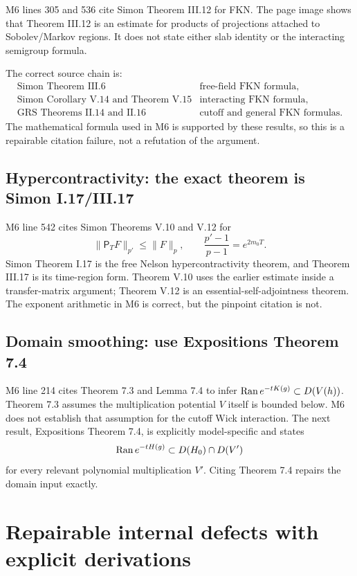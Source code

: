 \documentclass[10pt,a4paper]{article}
\begin{document}
M6 lines 305 and 536 cite Simon Theorem III.12 for FKN.  The page image shows that
Theorem III.12 is an estimate for products of projections attached to Sobolev/Markov
regions.  It does not state either slab identity or the interacting semigroup formula.

The correct source chain is:
\[
 \begin{array}{ll}
 \text{Simon Theorem III.6} & \text{free-field FKN formula},\\
 \text{Simon Corollary V.14 and Theorem V.15} & \text{interacting FKN formula},\\
 \text{GRS Theorems II.14 and II.16} & \text{cutoff and general FKN formulas}.
 \end{array}
\]
The mathematical formula used in M6 is supported by these results, so this is a
repairable citation failure, not a refutation of the argument.

\subsection{Hypercontractivity: the exact theorem is Simon I.17/III.17}

M6 line 542 cites Simon Theorems V.10 and V.12 for
\[
 \|\mathsf P_TF\|_{p'}\leq\|F\|_p,
 \qquad\frac{p'-1}{p-1}=e^{2m_0T}.
\]
Simon Theorem I.17 is the free Nelson hypercontractivity theorem, and Theorem III.17
is its time-region form.  Theorem V.10 uses the earlier estimate inside a transfer-matrix
argument; Theorem V.12 is an essential-self-adjointness theorem.  The exponent arithmetic
in M6 is correct, but the pinpoint citation is not.

\subsection{Domain smoothing: use Expositions Theorem 7.4}

M6 line 214 cites Theorem 7.3 and Lemma 7.4 to infer
$\operatorname{Ran} e^{-tK(g)}\subset D(V(h))$.  Theorem 7.3 assumes the multiplication potential
$V$ itself is bounded below.  M6 does not establish that assumption for the cutoff Wick
interaction.  The next result, Expositions Theorem 7.4, is explicitly model-specific and
states
\[
 \operatorname{Ran} e^{-tH(g)}\subset D(H_0)\cap D(V')
\]
for every relevant polynomial multiplication $V'$.  Citing Theorem 7.4 repairs the
domain input exactly.

\section{Repairable internal defects with explicit derivations}
\end{document}
